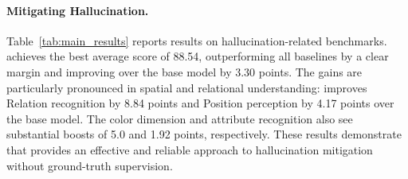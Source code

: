 


\paragraph{Mitigating Hallucination.}
Table~\ref{tab:main_results} reports results on hallucination-related benchmarks.
\ours achieves the best average score of 88.54, outperforming all baselines by a clear margin and improving over the base model by 3.30 points.
The gains are particularly pronounced in spatial and relational understanding: \ours improves Relation recognition by 8.84 points and Position perception by 4.17 points over the base model. The color dimension and attribute recognition also see substantial boosts of 5.0 and 1.92 points, respectively.
These results demonstrate that \ours provides an effective and reliable approach to hallucination mitigation without ground-truth supervision.

